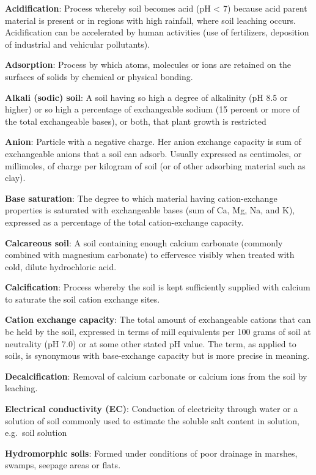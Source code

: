 \documentclass[
  10pt,
  b5paper,
]{book}
\begin{document}
\textbf{Acidification}: Process whereby soil becomes acid (pH \textless{} 7) because acid parent material is present or in regions with high rainfall, where soil leaching occurs. Acidification can be accelerated by human activities (use of fertilizers, deposition of industrial and vehicular pollutants).

\textbf{Adsorption}: Process by which atoms, molecules or ions are retained on the surfaces of solids by chemical or physical bonding.

\textbf{Alkali (sodic) soil}: A soil having so high a degree of alkalinity (pH 8.5 or higher) or so high a percentage of exchangeable sodium (15 percent or more of the total exchangeable bases), or both, that plant growth is restricted

\textbf{Anion}: Particle with a negative charge. Her anion exchange capacity is sum of exchangeable anions that a soil can adsorb. Usually expressed as centimoles, or millimoles, of charge per kilogram of soil (or of other adsorbing material such as clay).

\textbf{Base saturation}: The degree to which material having cation-exchange properties is saturated with exchangeable bases (sum of Ca, Mg, Na, and K), expressed as a percentage of the total cation-exchange capacity.

\textbf{Calcareous soil}: A soil containing enough calcium carbonate (commonly combined with magnesium carbonate) to effervesce visibly when treated with cold, dilute hydrochloric acid.

\textbf{Calcification}: Process whereby the soil is kept sufficiently supplied with calcium to saturate the soil cation exchange sites.

\textbf{Cation exchange capacity}: The total amount of exchangeable cations that can be held by the soil, expressed in terms of mill equivalents per 100 grams of soil at neutrality (pH 7.0) or at some other stated pH value. The term, as applied to soils, is synonymous with base-exchange capacity but is more precise in meaning.

\textbf{Decalcification}: Removal of calcium carbonate or calcium ions from the soil by leaching.

\textbf{Electrical conductivity (EC)}: Conduction of electricity through water or a solution of soil commonly used to estimate the soluble salt content in solution, e.g.~soil solution

\textbf{Hydromorphic soils}: Formed under conditions of poor drainage in marshes, swamps, seepage areas or flats.
\end{document}

